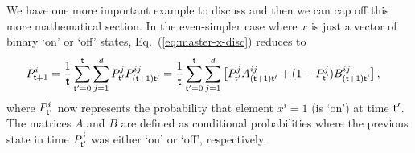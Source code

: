 We have one more important example to discuss and then we can cap off this more mathematical section. In the even-simpler case where $x$ is just a vector of binary `on' or `off' states, Eq.~(\ref{eq:master-x-disc}) reduces to
\begin{align}
P^i_{{\sf t}+1} &= \frac{1}{{\sf t}}\sum_{{\sf t}'=0}^{\sf t} \sum_{j=1}^d P^j_{{\sf t}'} P^{ij}_{({\sf t}+1){\sf t}'} = \frac{1}{{\sf t}}\sum_{{\sf t}'=0}^{\sf t} \sum_{j=1}^d \big[ P^j_{{\sf t}'} A^{ij}_{({\sf t}+1){\sf t}'} + (1-P^j_{{\sf t}'}) B^{ij}_{({\sf t}+1){\sf t}'} \big] \label{eq:master-x-disc-binary}\,,
\end{align}
where $P^i_{{\sf t}'}$ now represents the probability that element $x^i=1$ (is `on') at time ${\sf t}'$. The matrices $A$ and $B$ are defined as conditional probabilities where the previous state in time $P^j_{{\sf t}'}$ was either `on' or `off', respectively.
